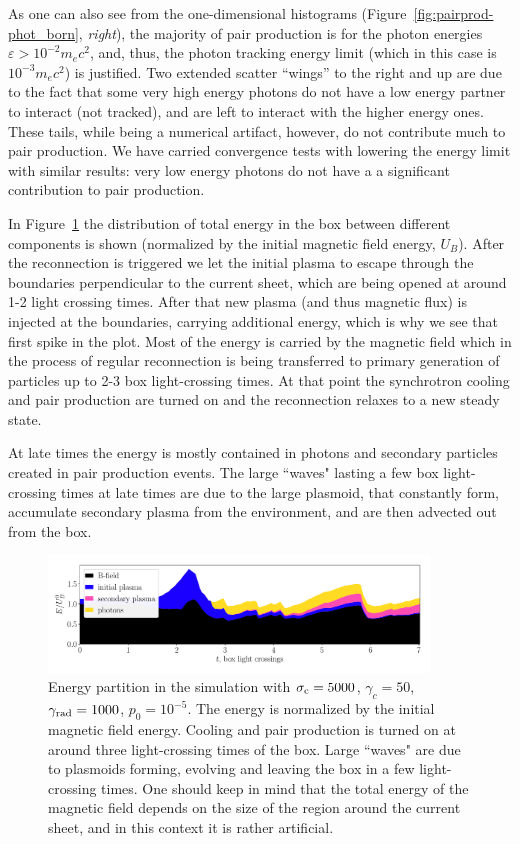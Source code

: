 As one can also see from the one-dimensional histograms (Figure~\ref{fig:pairprod-phot_born}, {\it right}), the majority of pair production is for the photon energies $\varepsilon>10^{-2}m_e c^2$, and, thus, the photon tracking energy limit (which in this case is $10^{-3} m_e c^2$) is justified. Two extended scatter ``wings'' to the right and up are due to the fact that some very high energy photons do not have a low energy partner to interact (not tracked), and are left to interact with the higher energy ones. These tails, while being a numerical artifact, however, do not contribute much to pair production. We have carried convergence tests with lowering the energy limit with similar results: very low energy photons do not have a a significant contribution to pair production.

In Figure~\ref{fig:pairprod-energy_vs_time} the distribution of total energy in the box between different components is shown (normalized by the initial magnetic field energy, $U_B$). After the reconnection is triggered we let the initial plasma to escape through the boundaries perpendicular to the current sheet, which are being opened at around 1-2 light crossing times. After that new plasma (and thus magnetic flux) is injected at the boundaries, carrying additional energy, which is why we see that first spike in the plot. Most of the energy is carried by the magnetic field which in the process of regular reconnection is being transferred to primary generation of particles up to 2-3 box light-crossing times. At that point the synchrotron cooling and pair production are turned on and the reconnection relaxes to a new steady state.

At late times the energy is mostly contained in photons and secondary particles created in pair production events. The large ``waves" lasting a few box light-crossing times at late times are due to the large plasmoid, that constantly form, accumulate secondary plasma from the environment, and are then advected out from the box.

\begin{figure}[tb]
    \centering
    \includegraphics[width=0.9\textwidth]{figures/ch4-pairproduction/fig_b3.pdf}
    \caption{Energy partition in the simulation with $\sigma_{\rm c}=5000$, $\gamma_c=50$, $\gamma_{\rm rad}=1000$, $p_0=10^{-5}$. The energy is normalized by the initial magnetic field energy. Cooling and pair production is turned on at around three light-crossing times of the box. Large ``waves" are due to plasmoids forming, evolving and leaving the box in a few light-crossing times. One should keep in mind that the total energy of the magnetic field depends on the size of the region around the current sheet, and in this context it is rather artificial.}
    \label{fig:pairprod-energy_vs_time}
\end{figure}
